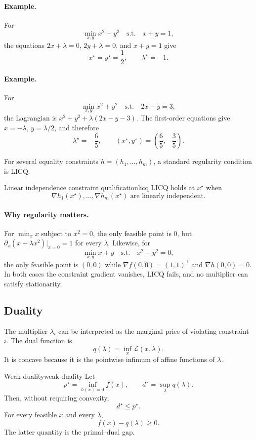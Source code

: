 \documentclass[11pt]{article}
\newcommand{\trans}{^{\mathsf T}}
\newcommand{\grad}{\nabla}
\theoremstyle{definition}
\theoremstyle{remark}
\begin{document}
\paragraph{Example.}
For
\[
\min_{x,y}x^2+y^2\quad\text{s.t.}\quad x+y=1,
\]
the equations $2x+\lambda=0$, $2y+\lambda=0$, and $x+y=1$ give
\[
\boxed{x^\star=y^\star=\frac12,\qquad\lambda^\star=-1.}
\]

\paragraph{Example.}
For
\[
\min_{x,y}x^2+y^2\quad\text{s.t.}\quad2x-y=3,
\]
the Lagrangian is $x^2+y^2+\lambda(2x-y-3)$. The first-order equations give
$x=-\lambda$, $y=\lambda/2$, and therefore
\[
\boxed{\lambda^\star=-\frac65,\qquad
(x^\star,y^\star)=\left(\frac65,-\frac35\right).}
\]

For several equality constraints $h=(h_1,\ldots,h_m)$, a standard regularity
condition is LICQ.

\begin{keyproposition}{Linear independence constraint qualification}{licq}
LICQ holds at $x^\star$ when
\[
  \boxed{\grad h_1(x^\star),\ldots,\grad h_m(x^\star)
  \text{ are linearly independent}.}
\]
\end{keyproposition}

\paragraph{Why regularity matters.}
For $\min_x x$ subject to $x^2=0$, the only feasible point is $0$, but
$\partial_x(x+\lambda x^2)|_{x=0}=1$ for every $\lambda$. Likewise, for
\[
\min_{x,y}x+y\quad\text{s.t.}\quad x^2+y^2=0,
\]
the only feasible point is $(0,0)$ while
$\grad f(0,0)=(1,1)\trans$ and $\grad h(0,0)=0$. In both cases the constraint
gradient vanishes, LICQ fails, and no multiplier can satisfy stationarity.

\subsection{Duality}

The multiplier $\lambda_i$ can be interpreted as the marginal price of
violating constraint $i$. The dual function is
\[
  q(\lambda)=\inf_x\mathcal L(x,\lambda).
\]
It is concave because it is the pointwise infimum of affine functions of
$\lambda$.

\begin{keyproposition}{Weak duality}{weak-duality}
Let
\[
  p^\star=\inf_{h(x)=0}f(x),
  \qquad d^\star=\sup_\lambda q(\lambda).
\]
Then, without requiring convexity,
\[
  \boxed{d^\star\leq p^\star.}
\]
For every feasible $x$ and every $\lambda$,
\[
  \boxed{f(x)-q(\lambda)\geq0.}
\]
The latter quantity is the primal--dual gap.
\end{keyproposition}
\end{document}
